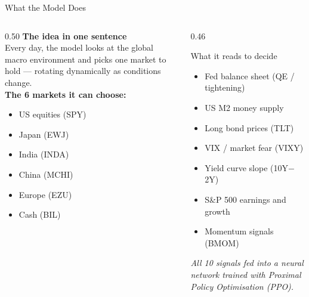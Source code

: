 \documentclass[aspectratio=169,11pt]{beamer}
\begin{document}
\begin{frame}{What the Model Does}
  \begin{columns}[T]
    \begin{column}{0.50\textwidth}
      \large\textbf{The idea in one sentence}\\[0.6em]
      \normalsize
      Every day, the model looks at the global macro environment and picks \alert{one market} to hold --- rotating dynamically as conditions change.\\[1em]

      \textbf{The 6 markets it can choose:}
      \vspace{0.3em}
      \begin{itemize}\normalsize
        \setlength\itemsep{0.3em}
        \item US equities (SPY)
        \item Japan (EWJ)
        \item India (INDA)
        \item China (MCHI)
        \item Europe (EZU)
        \item Cash (BIL)
      \end{itemize}
    \end{column}
    \begin{column}{0.46\textwidth}
      \begin{block}{What it reads to decide}
        \vspace{0.3em}\normalsize
        \begin{itemize}
          \setlength\itemsep{0.3em}
          \item Fed balance sheet (QE / tightening)
          \item US M2 money supply
          \item Long bond prices (TLT)
          \item VIX / market fear (VIXY)
          \item Yield curve slope (10Y$-$2Y)
          \item S\&P 500 earnings and growth
          \item Momentum signals (BMOM)
        \end{itemize}
        \vspace{0.3em}
      \end{block}
      \vspace{0.5em}
      \small\textit{All 10 signals fed into a neural network trained with Proximal Policy Optimisation (PPO).}
    \end{column}
  \end{columns}
\end{frame}
\end{document}
